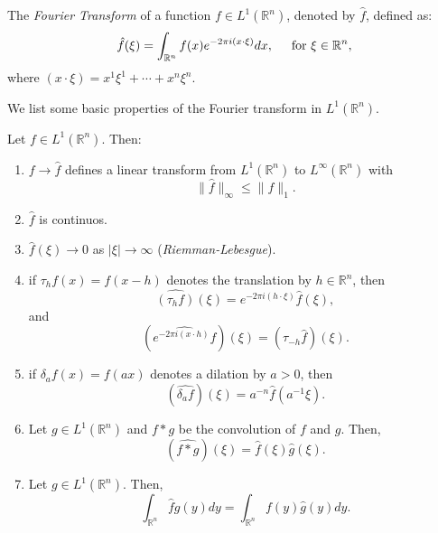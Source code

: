 \begin{definition}{}
  The \textit{Fourier Transform} of a function $f\in L^{1}(\mathbb{R}^n)$, denoted by $\hat{f}$, defined as:
	\begin{equation}
    \hat{f}(\xi)=\int_{\mathbb{R}^n}f(x)e^{-2\pi i (x \cdot \xi)}dx,\hspace{0.5cm}\text{for }\xi\in\mathbb{R}^{n},\label{definition:transform-of-f}
	\end{equation}
	where $(x\cdot \xi)=x^1\xi^1+\cdots+x^n\xi^n$.
\end{definition}
We list some basic properties of the Fourier transform in $L^1(\mathbb{R}^{n})$. 
\begin{theorem}{}\label{theorem:properties-of-fourier-transform-L1}
  Let $f\in L^1(\mathbb{R}^{n})$. Then:
  \begin{enumerate}
    \item $f\to \hat{f}$ defines a linear transform from $L^1(\mathbb{R}^{n})$ to $L^{\infty}(\mathbb{R}^{n})$ with
      \begin{equation}
        \|\hat{f}\|_{\infty}\leq \|f\|_{1}.\label{eq:2-2}
      \end{equation}
    \item $\hat{f}$ is continuos.\label{property:f-transform-is-continuos-l1}
    \item $\hat{f}(\xi)\to 0$ as $|\xi|\to \infty$ (\textit{Riemman-Lebesgue}).
    \item if $\tau_{h}f(x)=f(x-h)$ denotes the translation by $h\in\mathbb{R}^{n}$, then
      \begin{equation}
        \hat{(\tau_{h}f)}(\xi)=e^{-2\pi i(h\cdot \xi)}\hat{f}(\xi),\label{eq:2-3}
      \end{equation}
      and
      \begin{equation}
        (\hat{e^{-2\pi i(x\cdot h)}f})(\xi)=(\tau_{-h}\hat{f})(\xi).\label{eq:2-4}
      \end{equation}\label{property:traslation-f-transform-l1}
    \item if $\delta_{a}f(x)=f(ax)$ denotes a dilation by $a>0$, then
      \begin{equation}
        (\hat{\delta_{a}f})(\xi)=a^{-n}\hat{f}(a^{-1}\xi).\label{eq:2-5}
      \end{equation}
    \item Let $g\in L^1(\mathbb{R}^{n})$ and $f*g$ be the convolution of $f$ and $g$. Then,
      \begin{equation}
        (\hat{f*g})(\xi)=\hat{f}(\xi)\hat{g}(\xi).\label{eq:2-6}
      \end{equation}
    \item Let $g\in L^1(\mathbb{R}^{n})$. Then,
      \begin{equation}
        \int_{\mathbb{R}^{n}}\hat{f}g(y)dy=\int_{\mathbb{R}^{n}}f(y)\hat{g}(y)dy.\label{eq:2-7}
      \end{equation}\label{property:change-transform-l1}
  \end{enumerate}
\end{theorem}
